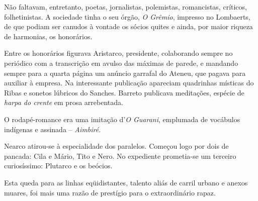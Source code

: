 Não faltavam,
entretanto, poetas, jornalistas, polemistas, romancistas, críticos,
folhetinistas. A sociedade tinha o seu órgão, \textit{O Grêmio}, impresso no
Lombaerts, de que podiam ser canudos à vontade os sócios quites e
ainda, por maior riqueza de harmonias, os honorários. 

Entre os
honorários figurava Aristarco, presidente, colaborando sempre no
periódico com a transcrição em avulso das máximas de parede, e mandando
sempre para a quarta página um anúncio garrafal do Ateneu, que pagava
para auxiliar à empresa. Na interessante publicação apareciam
quadrinhas místicas do Ribas e sonetos lúbricos do Sanches. Barreto
publicava meditações, espécie de \textit{harpa do crente} em prosa arrebentada.

O rodapé{}-romance era uma imitação d'\textit{O Guarani}, emplumada de vocábulos
indígenas e assinada -- \textit{Aimbiré}. 

Nearco atirou{}-se à especialidade dos
paralelos. Começou logo por dois de pancada: Cila e Mário, Tito e Nero.
No expediente prometia{}-se um terceiro curiosíssimo: Plutarco e os
beócios. 

Esta queda para as linhas eqüidistantes, talento aliás de
carril urbano e anexos muares, foi mais uma razão de prestígio para o
extraordinário rapaz. 

